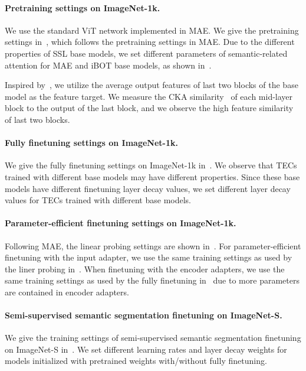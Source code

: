 \documentclass{article} \usepackage{iclr2023_conference,times}
\begin{document}
\paragraph{Pretraining settings on ImageNet-1k.}
We use the standard ViT network implemented in MAE.
We give the pretraining settings in~,
which follows the pretraining settings in MAE.
Due to the different properties of SSL base models,
we set different parameters of semantic-related attention for MAE and iBOT base models, as shown in~.

Inspired by~\citep{baevski2022data2vec}, we utilize the average output features of last two blocks of the base model as the feature target.
We measure the CKA similarity~\citep{kornblith2019similarity} of each mid-layer block to the output of the last block,
and we observe the high feature similarity of last two blocks.


\paragraph{Fully finetuning settings on ImageNet-1k.}
We give the fully finetuning settings on ImageNet-1k in~.
We observe that TECs trained with different base models may have different properties.
Since these base models have different finetuning layer decay values,
we set different layer decay values for TECs trained with different base models.


\paragraph{Parameter-efficient finetuning settings on ImageNet-1k.}
Following MAE, the linear probing settings are shown in~.
For parameter-efficient finetuning with the input adapter,
we use the same training settings as used by the liner probing in~.
When finetuning with the encoder adapters,
we use the same training settings as used by the fully finetuning in~ due to more parameters are contained in encoder adapters.

\paragraph{Semi-supervised semantic segmentation finetuning on ImageNet-S.}
We give the training settings of semi-supervised semantic segmentation finetuning on ImageNet-S in~.
We set different learning rates and layer decay weights for models
initialized with pretrained weights with/without fully finetuning.
\end{document}
